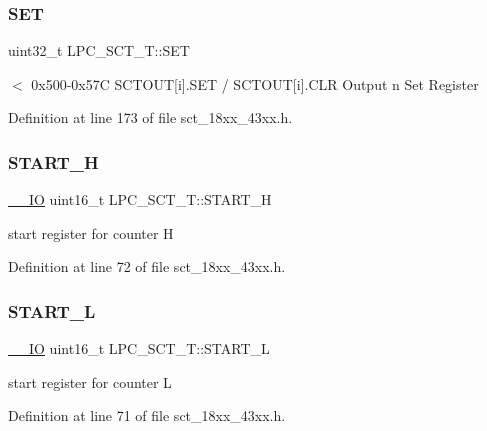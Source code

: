 \subsubsection{\texorpdfstring{S\+ET}{SET}}
{\footnotesize\ttfamily uint32\+\_\+t L\+P\+C\+\_\+\+S\+C\+T\+\_\+\+T\+::\+S\+ET}

$<$ 0x500-\/0x57C S\+C\+T\+O\+UT\mbox{[}i\mbox{]}.S\+ET / S\+C\+T\+O\+UT\mbox{[}i\mbox{]}.C\+LR Output n Set Register 

Definition at line 173 of file sct\+\_\+18xx\+\_\+43xx.\+h.

\mbox{\label{struct_l_p_c___s_c_t___t_a0d1c456c366479efeb77c402dce39536}} 
\subsubsection{\texorpdfstring{S\+T\+A\+R\+T\+\_\+H}{START\_H}}
{\footnotesize\ttfamily \hyperlink{core__sc300_8h_aec43007d9998a0a0e01faede4133d6be}{\+\_\+\+\_\+\+IO} uint16\+\_\+t L\+P\+C\+\_\+\+S\+C\+T\+\_\+\+T\+::\+S\+T\+A\+R\+T\+\_\+H}

start register for counter H 

Definition at line 72 of file sct\+\_\+18xx\+\_\+43xx.\+h.

\mbox{\label{struct_l_p_c___s_c_t___t_ab73e187a94e40e5b1a6d176adea4ac53}} 
\subsubsection{\texorpdfstring{S\+T\+A\+R\+T\+\_\+L}{START\_L}}
{\footnotesize\ttfamily \hyperlink{core__sc300_8h_aec43007d9998a0a0e01faede4133d6be}{\+\_\+\+\_\+\+IO} uint16\+\_\+t L\+P\+C\+\_\+\+S\+C\+T\+\_\+\+T\+::\+S\+T\+A\+R\+T\+\_\+L}

start register for counter L 

Definition at line 71 of file sct\+\_\+18xx\+\_\+43xx.\+h.

\mbox{\label{struct_l_p_c___s_c_t___t_abeacb1097562ec8b30de5ab2050d86cb}} 
